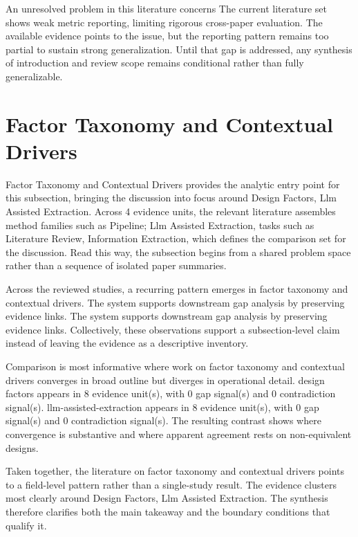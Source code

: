 \documentclass{article}
\begin{document}
An unresolved problem in this literature concerns The current literature set shows weak metric reporting, limiting rigorous cross-paper evaluation. The available evidence points to the issue, but the reporting pattern remains too partial to sustain strong generalization. Until that gap is addressed, any synthesis of introduction and review scope remains conditional rather than fully generalizable. \cite{08_2016_zhou_aap,17_2017_chen_aap}

\section{Factor Taxonomy and Contextual Drivers}
Factor Taxonomy and Contextual Drivers provides the analytic entry point for this subsection, bringing the discussion into focus around Design Factors, Llm Assisted Extraction. Across 4 evidence units, the relevant literature assembles method families such as Pipeline; Llm Assisted Extraction, tasks such as Literature Review, Information Extraction, which defines the comparison set for the discussion. Read this way, the subsection begins from a shared problem space rather than a sequence of isolated paper summaries. \cite{08_2016_zhou_aap,17_2017_chen_aap}

Across the reviewed studies, a recurring pattern emerges in factor taxonomy and contextual drivers. The system supports downstream gap analysis by preserving evidence links. The system supports downstream gap analysis by preserving evidence links. Collectively, these observations support a subsection-level claim instead of leaving the evidence as a descriptive inventory. \cite{08_2016_zhou_aap,17_2017_chen_aap,09_2018_jiang_aap}

Comparison is most informative where work on factor taxonomy and contextual drivers converges in broad outline but diverges in operational detail. design factors appears in 8 evidence unit(s), with 0 gap signal(s) and 0 contradiction signal(s). llm-assisted-extraction appears in 8 evidence unit(s), with 0 gap signal(s) and 0 contradiction signal(s). The resulting contrast shows where convergence is substantive and where apparent agreement rests on non-equivalent designs. \cite{08_2016_zhou_aap,17_2017_chen_aap,09_2018_jiang_aap}

Taken together, the literature on factor taxonomy and contextual drivers points to a field-level pattern rather than a single-study result. The evidence clusters most clearly around Design Factors, Llm Assisted Extraction. The synthesis therefore clarifies both the main takeaway and the boundary conditions that qualify it. \cite{08_2016_zhou_aap,17_2017_chen_aap}
\end{document}
